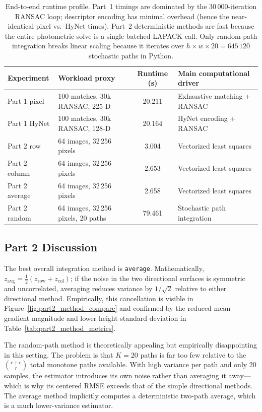 {\begin{table}[htbp]
\centering
\small
\begin{tabular}{l|l|c|l}
\hline
Experiment & Workload proxy & Runtime (s) & Main computational driver \\
\hline
Part 1 pixel  & 100 matches, 30k RANSAC, 225-D & 20.211 & Exhaustive matching + RANSAC \\
Part 1 HyNet  & 100 matches, 30k RANSAC, 128-D & 20.164 & HyNet encoding + RANSAC \\
Part 2 row    & 64 images, 32\,256 pixels & 3.004  & Vectorized least squares \\
Part 2 column & 64 images, 32\,256 pixels & 2.653  & Vectorized least squares \\
Part 2 average & 64 images, 32\,256 pixels & 2.658 & Vectorized least squares \\
Part 2 random & 64 images, 32\,256 pixels, 20 paths & 79.461 & Stochastic path integration \\
\hline
\end{tabular}
\caption{End-to-end runtime profile.  Part~1 timings are dominated by the
30\,000-iteration RANSAC loop; descriptor encoding has minimal overhead (hence
the near-identical pixel vs.\ HyNet times).
Part~2 deterministic methods are fast because the entire photometric solve is a
single batched LAPACK call.  Only random-path integration breaks linear scaling
because it iterates over $h \times w \times 20 = 645\,120$ stochastic paths in
Python.}
\label{tab:runtime_profile}
\end{table}

\subsection*{Part 2 Discussion}

The best overall integration method is \texttt{average}.  Mathematically,
$z_{\mathrm{avg}} = \tfrac{1}{2}(z_{\mathrm{row}} + z_{\mathrm{col}})$;
if the noise in the two directional surfaces is symmetric and uncorrelated,
averaging reduces variance by $1/\sqrt{2}$ relative to either directional method.
Empirically, this cancellation is visible in Figure~\ref{fig:part2_method_compare}
and confirmed by the reduced mean gradient magnitude and lower height standard
deviation in Table~\ref{tab:part2_method_metrics}.

The random-path method is theoretically appealing but empirically disappointing
in this setting.  The problem is that $K = 20$ paths is far too few relative to
the $\binom{r+c}{r}$ total monotone paths available.  With high variance per
path and only 20 samples, the estimator introduces its own noise rather than
averaging it away---which is why its centered RMSE exceeds that of the simple
directional methods.  The average method implicitly computes a deterministic
two-path average, which is a much lower-variance estimator.

}
